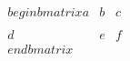 \documentclass[preview]{standalone}
\begin{document}
\begin{align*}
\quad\\begin{bmatrix} a & b & c \quad\\\quad\\ d & e & f \quad\\end{bmatrix}
\end{align*}
\end{document}
